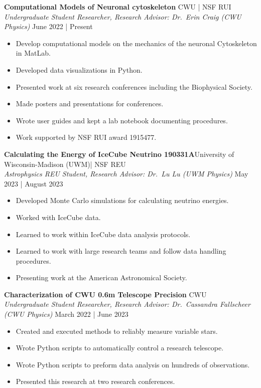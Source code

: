 \documentclass[a4paper,9pt]{extarticle}
\begin{document}
\noindent\textbf{Computational Models of Neuronal cytoskeleton} \hfill CWU | NSF RUI\\
\textit{Undergraduate Student Researcher, Research Advisor: Dr.\ Erin Craig (CWU Physics)} \hfill June 2022 | Present
\begin{itemize}
    \item Develop computational models on the mechanics of the neuronal Cytoskeleton in MatLab.
    \item Developed data visualizations in Python.
    \item Presented work at six research conferences including the Biophysical Society.
    \item Made posters and presentations for conferences.
    \item Wrote user guides and kept a lab notebook documenting procedures.
    \item Work supported by NSF RUI award 1915477.
\end{itemize}

\noindent\textbf{Calculating the Energy of IceCube Neutrino 190331A}\hfill University of Wisconsin-Madison  (UWM)| NSF REU\\
\textit{Astrophysics REU Student, Research Advisor: Dr.\ Lu Lu (UWM Physics)} \hfill May 2023 | August 2023
\begin{itemize}
    \item Developed Monte Carlo simulations for calculating neutrino energies.
    \item Worked with IceCube data.
    \item Learned to work within IceCube data analysis protocols.
    \item Learned to work with large research teams and follow data handling procedures.
    \item Presenting work at the American Astronomical Society.
\end{itemize}

\noindent\textbf{Characterization of CWU 0.6m Telescope Precision} \hfill CWU\\
\textit{Undergraduate Student Researcher, Research Advisor: Dr.\ Cassandra Fallscheer (CWU Physics)} \hfill March 2022 | June 2023
\begin{itemize}
    \item Created and executed methods to reliably measure variable stars.
    \item Wrote Python scripts to automatically control a research telescope.
    \item Wrote Python scripts to preform data analysis on hundreds of observations.
    \item Presented this research at two research conferences.
\end{itemize}
\end{document}
